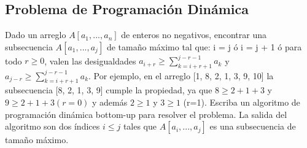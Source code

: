 \documentclass[10pt]{article}
\begin{document}
\subsection*{Problema de Programaci\'on Din\'amica}
Dado un arreglo $A[a_1,...,a_n]$ de enteros no negativos, encontrar una subsecuencia $A[a_1,...,a_j]$ de tama\~no m\'aximo tal que: i = j  \'o  i = j + 1 \'o para todo $r \geq 0$, valen las desigualdades $a_{i+r} \geq \sum_{k=i+r+1}^{j-r-1}a_k $ y $ a_{j-r} \geq \sum_{k=i+r+1}^{j-r-1}a_k$.
Por ejemplo, en el arreglo [1, 8, 2, 1, 3, 9, 10] la subsecuencia [8, 2, 1, 3, 9] cumple la propiedad, ya que $ 8 \geq 2 + 1 + 3 $ y $ 9 \geq 2 + 1 + 3 (r=0) $ y adem\'as $ 2 \geq 1 $ y $ 3 \geq 1 $ (r=1).
Escriba un algoritmo de programaci\'on din\'amica bottom-up para resolver el problema. La salida del algoritmo son dos \'indices $ i \leq j $ tales que $A[a_i,...,a_j]$ es una subsecuencia de tama\~no m\'aximo.
\end{document}

